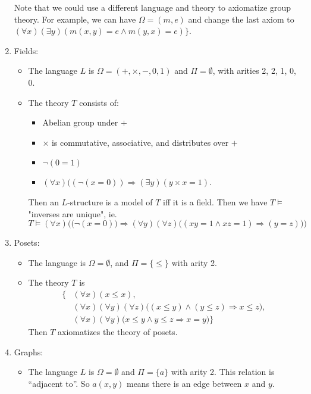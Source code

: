 \documentclass[a4paper]{article}
\begin{document}
\begin{eg}
\begin{enumerate}
     Note that we could use a different language and theory to axiomatize group theory. For example, we can have $\Omega = (m, e)$ and change the last axiom to $(\forall x)(\exists y)(m(x, y) = e\wedge m(y, x) = e)\}$.
  \item Fields:
    \begin{itemize}
      \item The language $L$ is $\Omega = (+, \times, -, 0, 1)$ and $\Pi = \emptyset$, with arities 2, 2, 1, 0, 0.
      \item The theory $T$ consists of:
        \begin{itemize}
          \item Abelian group under $+$
          \item $\times$ is commutative, associative, and distributes over $+$
          \item $\neg (0 = 1)$
          \item $(\forall x)((\neg(x = 0)) \Rightarrow  (\exists y)(y\times x = 1)$.
        \end{itemize}
        Then an $L$-structure is a model of $T$ iff it is a field. Then we have $T\models$ "inverses are unique", ie.
        \[
          T\models (\forall x)\Big(\big(\neg(x = 0)\big) \Rightarrow (\forall y)(\forall z)\big((xy = 1 \wedge xz = 1)\Rightarrow (y = z)\big)\Big)
        \]
    \end{itemize}
  \item Posets:
    \begin{itemize}
      \item The language is $\Omega = \emptyset$, and $\Pi=\{\leq\}$ with arity 2.
      \item The theory $T$ is
        \begin{align*}
          \{& (\forall x)(x \leq x),\\
            & (\forall x)(\forall y)(\forall z)\big((x \leq y)\wedge(y \leq z) \Rightarrow x \leq z\big),\\
          & (\forall x)(\forall y)\big(x \leq y \wedge y \leq z \Rightarrow x = y\big)\}
        \end{align*}
        Then $T$ axiomatizes the theory of posets.
    \end{itemize}
  \item Graphs:
    \begin{itemize}
      \item The language $L$ is $\Omega = \emptyset$ and $\Pi = \{a\}$ with arity 2. This relation is ``adjacent to''. So $a(x, y)$ means there is an edge between $x$ and $y$.

\end{itemize}
\end{enumerate}
\end{eg}
\end{document}
